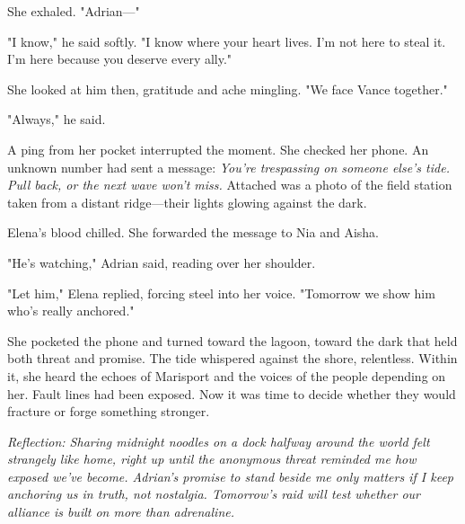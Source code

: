 She exhaled. "Adrian—"

"I know," he said softly. "I know where your heart lives. I'm not here to steal it. I'm here because you deserve every ally."

She looked at him then, gratitude and ache mingling. "We face Vance together."

"Always," he said.

A ping from her pocket interrupted the moment. She checked her phone. An unknown number had sent a message: \textit{You're trespassing on someone else's tide. Pull back, or the next wave won't miss.} Attached was a photo of the field station taken from a distant ridge—their lights glowing against the dark.

Elena's blood chilled. She forwarded the message to Nia and Aisha.

"He's watching," Adrian said, reading over her shoulder.

"Let him," Elena replied, forcing steel into her voice. "Tomorrow we show him who's really anchored."

She pocketed the phone and turned toward the lagoon, toward the dark that held both threat and promise. The tide whispered against the shore, relentless. Within it, she heard the echoes of Marisport and the voices of the people depending on her. Fault lines had been exposed. Now it was time to decide whether they would fracture or forge something stronger.


\noindent\textit{Reflection: Sharing midnight noodles on a dock halfway around the world felt strangely like home, right up until the anonymous threat reminded me how exposed we've become. Adrian's promise to stand beside me only matters if I keep anchoring us in truth, not nostalgia. Tomorrow's raid will test whether our alliance is built on more than adrenaline.}
